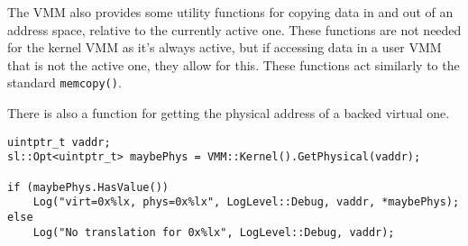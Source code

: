 The VMM also provides some utility functions for copying data in and out of an address space, relative to the currently active one. These functions are not needed for the kernel VMM as it's always active, but if accessing data in a user VMM that is not the active one, they allow for this. These functions act similarly to the standard \lstinline{memcopy()}.

There is also a function for getting the physical address of a backed virtual one.
\begin{lstlisting}
uintptr_t vaddr;
sl::Opt<uintptr_t> maybePhys = VMM::Kernel().GetPhysical(vaddr);

if (maybePhys.HasValue())
    Log("virt=0x%lx, phys=0x%lx", LogLevel::Debug, vaddr, *maybePhys);
else
    Log("No translation for 0x%lx", LogLevel::Debug, vaddr);
\end{lstlisting}

